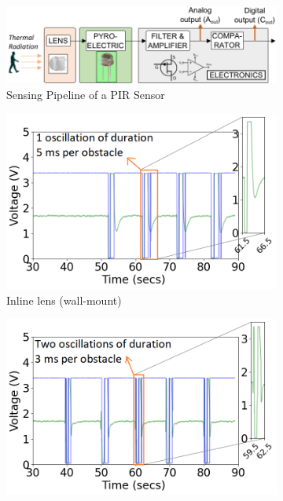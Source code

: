 \begin{figure}
	\centering
    \begin{subfigure}[b]{0.4\textwidth} %
        \begin{flushleft}
            \includegraphics[width=\textwidth]{figures/platform/pir-block-diagram-2-redraw-camera.png}
            \caption{Sensing Pipeline of a PIR Sensor}
            \label{fig:pir_sensing_pipeline}
        \end{flushleft}
    \end{subfigure}%
    \hfill
	\begin{subfigure}[t]{0.3\textwidth}
		\centering
		\includegraphics[width=\textwidth]{figures/lens_types/inline_lens.png}
		\caption{Inline lens (wall-mount)}
		\label{fig:inline_lens}
	\end{subfigure}%
	\begin{subfigure}[t]{0.3\textwidth}
		\centering
		\includegraphics[width=\textwidth]{figures/lens_types/round_lens.png}

\end{subfigure}
\end{figure}
